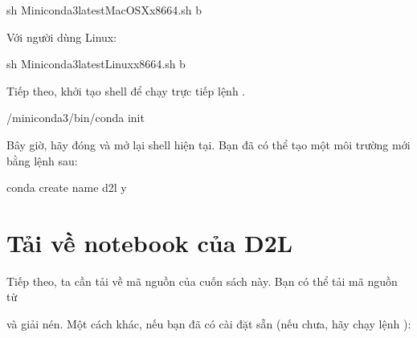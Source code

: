\documentclass[letterpaper,11pt,english]{sphinxmanual}
\begin{document}
\begin{sphinxVerbatim}[commandchars=\\\{\}]
sh Miniconda3\PYGZhy{}latest\PYGZhy{}MacOSX\PYGZhy{}x86\PYGZus{}64.sh \PYGZhy{}b
\end{sphinxVerbatim}



Với người dùng Linux:

\begin{sphinxVerbatim}[commandchars=\\\{\}]
sh Miniconda3\PYGZhy{}latest\PYGZhy{}Linux\PYGZhy{}x86\PYGZus{}64.sh \PYGZhy{}b
\end{sphinxVerbatim}



Tiếp theo, khởi tạo shell để chạy trực tiếp lệnh .

\begin{sphinxVerbatim}[commandchars=\\\{\}]
\PYGZti{}/miniconda3/bin/conda init
\end{sphinxVerbatim}



Bây giờ, hãy đóng và mở lại shell hiện tại. Bạn đã có thể tạo một môi
trường mới bằng lệnh sau:

\begin{sphinxVerbatim}[commandchars=\\\{\}]
conda create \PYGZhy{}\PYGZhy{}name d2l \PYGZhy{}y
\end{sphinxVerbatim}




\section{Tải về notebook của D2L}
\label{\detokenize{chapter_install/index_vn:tai-ve-notebook-cua-d2l}}


Tiếp theo, ta cần tải về mã nguồn của cuốn sách này. Bạn có thể tải mã
nguồn từ %
\begin{footnote}[26]\sphinxAtStartFootnote
{}
%
\end{footnote} và giải
nén. Một cách khác, nếu bạn đã có cài đặt sẵn  (nếu chưa, hãy
chạy lệnh ):
\end{document}
